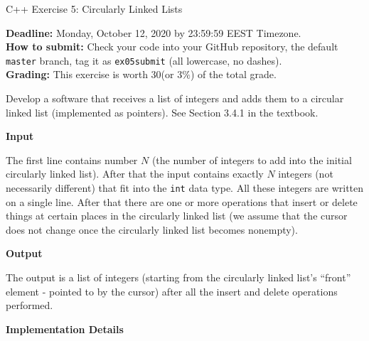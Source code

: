 \documentclass[11pt]{article}
\begin{document}
\thispagestyle{empty}


\begin{center}
{\Large C++ Exercise 5: Circularly Linked Lists}
\end{center}



{\bf Deadline:} Monday, October 12, 2020 by 23:59:59 EEST Timezone.\\ 
{\bf How to submit:} Check your code into your GitHub repository, the default {\tt master} branch, 
tag it as {\tt ex05submit} (all lowercase, no dashes).\\
{\bf Grading:} This exercise is worth 30\textperthousand (or $3\%$) of the total grade.


\vspace{10pt}
Develop a software that receives a list of integers
and adds them to a circular linked list (implemented 
as pointers). See Section 3.4.1 in the textbook. 

\vspace{10pt}
{\bf Input}

The first line contains number $N$ (the number of integers to add
into the initial circularly linked list). 
After that the input contains exactly $N$ integers 
(not necessarily different) that fit into the {\tt int} data type.
All these integers are written on a single line.  
After that there are one or more operations that insert or delete 
things at certain places in the circularly linked list 
(we assume that the cursor does not change once the circularly 
linked list becomes nonempty).


\vspace{10pt}
{\bf Output}

The output is a list of integers (starting from the 
circularly linked list's ``front'' element - pointed to by the cursor) 
after all the insert and delete
operations performed. 



\vspace{10pt}
{\bf Implementation Details}
\end{document}
